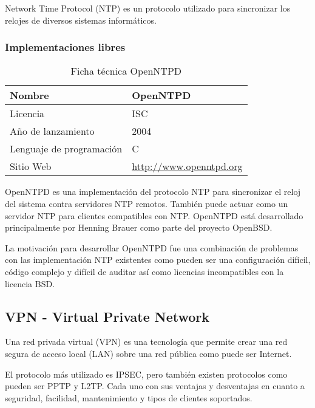 Network Time Protocol (NTP) es un protocolo utilizado para sincronizar los relojes de diversos sistemas informáticos.

\subsubsection {Implementaciones libres}

\begin{table}[H]
\begin{tabular}{|l|l|}
\hline
Nombre                   & OpenNTPD                       \\ \hline
Licencia                 & ISC                            \\ \hline
Año de lanzamiento       & 2004                           \\ \hline
Lenguaje de programación & C                              \\ \hline
Sitio Web                & \url{http://www.openntpd.org}  \\ \hline
\end{tabular}
\caption{Ficha técnica OpenNTPD}
\end{table}

OpenNTPD es una implementación del protocolo NTP para sincronizar el reloj del sistema contra servidores NTP remotos. También puede actuar como un servidor NTP para clientes compatibles con NTP. OpenNTPD está desarrollado principalmente por Henning Brauer como parte del proyecto OpenBSD.

\bigskip
La motivación para desarrollar OpenNTPD fue una combinación de problemas con las implementación NTP existentes como pueden ser una configuración difícil, código complejo y difícil de auditar así como licencias incompatibles con la licencia BSD.


\subsection {VPN - Virtual Private Network}

Una red privada virtual (VPN) es una tecnología que permite crear una red segura de acceso local (LAN) sobre una red pública como puede ser Internet.

\bigskip
El protocolo más utilizado es IPSEC, pero también existen protocolos como pueden ser PPTP y L2TP. Cada uno con sus ventajas y desventajas en cuanto a seguridad, facilidad, mantenimiento y tipos de clientes soportados.



